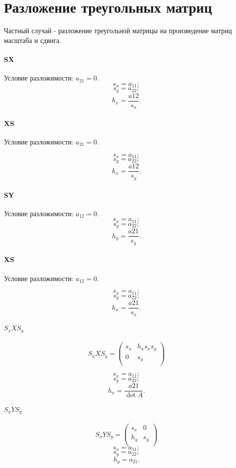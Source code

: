 \section{Разложение треугольных матриц}

Частный случай - разложение треугольной матрицы на произведение матриц масштаба и сдвига.

\paragraph{SX}

Условие разложимости: $a_21 = 0$.
$$s_x = a_{11};$$
$$s_y = a_{22};$$
$$h_x = \frac{a{12}}{s_x}.$$

\paragraph{XS}

Условие разложимости: $a_21 = 0$.

$$s_x = a_{11};$$
$$s_y = a_{22};$$
$$h_x = \frac{a{12}}{s_y}.$$


\paragraph{SY}

Условие разложимости: $a_12 = 0$.
$$s_x = a_{11};$$
$$s_y = a_{22};$$
$$h_y = \frac{a{21}}{s_y}.$$

\paragraph{XS}

Условие разложимости: $a_12 = 0$.

$$s_x = a_{11};$$
$$s_y = a_{22};$$
$$h_x = \frac{a{21}}{s_x}.$$


\paragraph{$S_xXS_y$}
$$S_xXS_y = \begin{pmatrix} s_x & h_x s_x s_y \\ 0 & s_y \\ \end{pmatrix} $$

$$s_x = a_{11};$$
$$s_y = a_{22};$$
$$h_x = \frac{a{21}}{\det A}.$$

\paragraph{$S_xYS_y$}
$$S_xYS_y = \begin{pmatrix} s_x & 0 \\ h_y & s_y \\ \end{pmatrix} $$
$$s_x = a_{11};$$
$$s_y = a_{22};$$
$$h_y = a_{21}.$$


